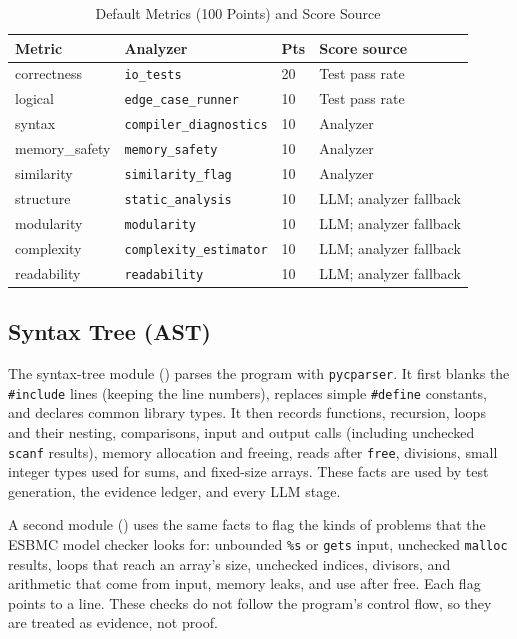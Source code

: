 \documentclass[conference]{IEEEtran}
\begin{document}
\begin{table}[!t]
\centering
\caption{Default Metrics (100 Points) and Score Source}
\label{tab:metrics}
\footnotesize
{}
\begin{tabularx}{\columnwidth}{@{}L{1.7cm} >{\scriptsize\raggedright\arraybackslash}p{3.0cm} C{0.45cm} Y@{}}
\toprule
{}
\textbf{Metric} & \textbf{Analyzer} & \textbf{Pts} & \textbf{Score source} \\
\midrule
correctness & \texttt{io\_tests} & 20 & Test pass rate \\
logical & \texttt{edge\_case\_runner} & 10 & Test pass rate \\
syntax & \texttt{compiler\_diagnostics} & 10 & Analyzer \\
memory\_safety & \texttt{memory\_safety} & 10 & Analyzer \\
similarity & \texttt{similarity\_flag} & 10 & Analyzer \\
structure & \texttt{static\_analysis} & 10 & LLM; analyzer fallback \\
modularity & \texttt{modularity} & 10 & LLM; analyzer fallback \\
complexity & \texttt{complexity\_estimator} & 10 & LLM; analyzer fallback \\
readability & \texttt{readability} & 10 & LLM; analyzer fallback \\
\bottomrule
\end{tabularx}
\end{table}

\subsection{Syntax Tree (AST)}
The syntax-tree module () parses the program with
\texttt{pycparser}. It first blanks the \texttt{\#include} lines (keeping the line
numbers), replaces simple \texttt{\#define} constants, and declares common library
types. It then records functions, recursion, loops and their nesting, comparisons,
input and output calls (including unchecked \texttt{scanf} results), memory
allocation and freeing, reads after \texttt{free}, divisions, small integer types
used for sums, and fixed-size arrays. These facts are used by test generation,
the evidence ledger, and every LLM stage.

A second module () uses the same facts to flag the kinds of
problems that the ESBMC model checker looks for: unbounded \texttt{\%s} or
\texttt{gets} input, unchecked \texttt{malloc} results, loops that reach an
array's size, unchecked indices, divisors, and arithmetic that come from input,
memory leaks, and use after free. Each flag points to a line. These checks do
not follow the program's control flow, so they are treated as evidence, not
proof.
\end{document}
